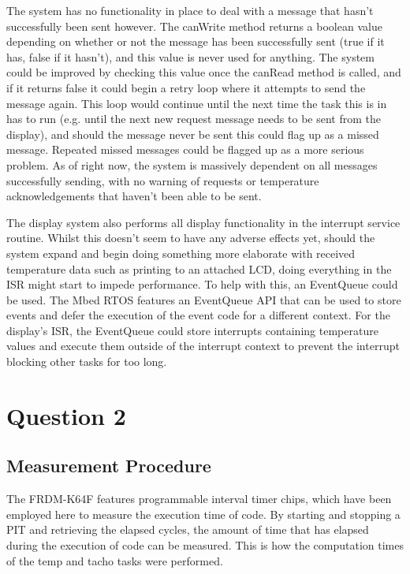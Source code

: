 \documentclass[]{report}
\begin{document}
		\medskip
		
		The system has no functionality in place to deal with a message that hasn't successfully been sent however. The canWrite method returns a boolean value depending on whether or not the message has been successfully sent (true if it has, false if it hasn't), and this value is never used for anything. The system could be improved by checking this value once the canRead method is called, and if it returns false it could begin a retry loop where it attempts to send the message again. This loop would continue until the next time the task this is in has to run (e.g. until the next new request message needs to be sent from the display), and should the message never be sent this could flag up as a missed message. Repeated missed messages could be flagged up as a more serious problem. As of right now, the system is massively dependent on all messages successfully sending, with no warning of requests or temperature acknowledgements that haven't been able to be sent.
		
		The display system also performs all display functionality in the interrupt service routine. Whilst this doesn't seem to have any adverse effects yet, should the system expand and begin doing something more elaborate with received temperature data such as printing to an attached LCD, doing everything in the ISR might start to impede performance. To help with this, an EventQueue could be used. The Mbed RTOS features an EventQueue API\cite{mbedoseventqueue} that can be used to store events and defer the execution of the event code for a different context. For the display's ISR, the EventQueue could store interrupts containing temperature values and execute them outside of the interrupt context to prevent the interrupt blocking other tasks for too long.
		
		\section{Question 2}
			\subsection{Measurement Procedure}
			The FRDM-K64F features programmable interval timer chips, which have been employed here to measure the execution time of code. By starting and stopping a PIT and retrieving the elapsed cycles, the amount of time that has elapsed during the execution of code can be measured. This is how the computation times of the temp and tacho tasks were performed. 
			\medskip
			
\end{document}
